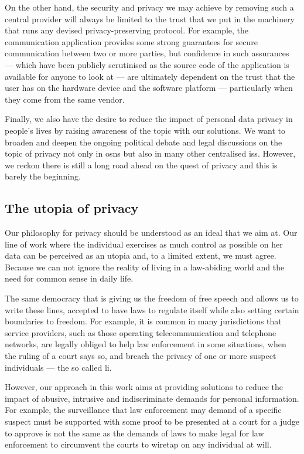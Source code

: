 On the other hand, the security and privacy we may achieve by removing such a central 
provider will always be limited to the trust that we put in the machinery that runs 
any devised privacy-preserving protocol. For example, the communication application \Signal 
provides some strong guarantees for secure communication between two or more parties, 
but confidence in such assurances --- which have been publicly scrutinised as 
the source code of the application is available for anyone to look at --- are ultimately 
dependent on the trust that the user has on the hardware device and the software platform 
--- particularly when they come from the same vendor.

Finally, we also have the desire to reduce the impact of personal data privacy in 
people's lives by raising awareness of the topic with our solutions. We want to 
broaden and deepen the ongoing political debate and legal discussions on the topic 
of privacy not only in \acp{osn} but also in many other centralised \acp{is}. However, 
we reckon there is still a long road ahead on the quest of privacy and this is barely 
the beginning.

\subsection{The utopia of privacy}
    \label{subsection:thesis:utopia-of-privacy}
Our philosophy for privacy should be understood as an ideal that we aim at. Our line 
of work where the individual exercises as much control as possible on her data can 
be perceived as an utopia and, to a limited extent, we must agree. Because we can 
not ignore the reality of living in a law-abiding world and the need for common 
sense in daily life. 

The same democracy that is giving us the freedom of free speech and allows us to 
write these lines, accepted to have laws to regulate itself while also setting certain 
boundaries to freedom. For example, it is common in many jurisdictions that service 
providers, such as those operating telecommunication and telephone networks, are 
legally obliged to help law enforcement in some situations, when the ruling of a 
court says so, and breach the privacy of one or more suspect individuals --- the 
so called \ac{li}.

However, our approach in this work aims at providing solutions to reduce the impact 
of abusive, intrusive and indiscriminate demands for personal information. For example, 
the surveillance that law enforcement may demand of a specific suspect must be supported 
with some proof to be presented at a court for a judge to approve is not the same 
as the demands of laws to make legal for law enforcement to circumvent the courts 
to wiretap on any individual at will.

